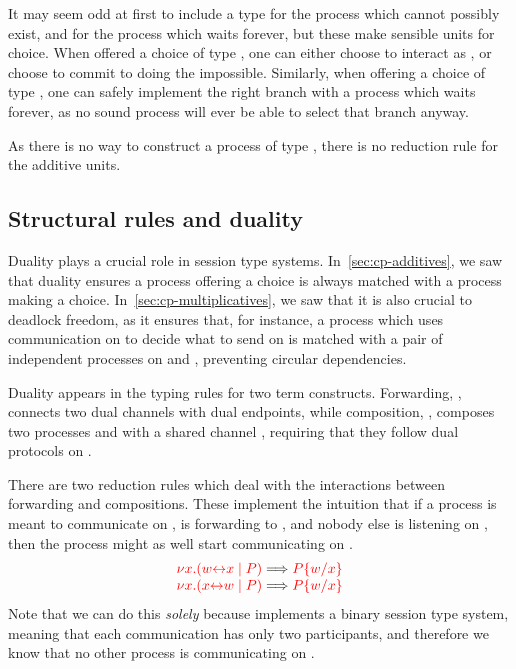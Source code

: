 It may seem odd at first to include a type for the process which cannot possibly
exist, and for the process which waits forever, but these make sensible units
for choice.
When offered a choice of type , one can either choose to
interact as , or choose to commit to doing the impossible.
Similarly, when offering a choice of type , one can safely
implement the right branch with a process which waits forever, as no sound
process will ever be able to select that branch anyway.
\begin{center}
  \cpInfNil
  \cpInfTop
\end{center}
As there is no way to construct a process of type \ty{\nil}, there is no
reduction rule for the additive units.


\subsection{Structural rules and duality}\label{sec:cp-duality}
Duality plays a crucial role in session type systems.
In~\cref{sec:cp-additives}, we saw that duality ensures a process offering a choice
is always matched with a process making a choice.
In~\cref{sec:cp-multiplicatives}, we saw that it is also crucial to deadlock freedom,
as it ensures that, for instance, a process which uses communication on 
to decide what to send on  is matched with a pair of independent processes
on  and , preventing circular dependencies.

Duality appears in the typing rules for two \rcp term constructs.
Forwarding, , connects two dual channels with dual endpoints,
while composition, , composes two processes  and
 with a shared channel , requiring that they follow dual protocols
on .
\begin{center}
  \cpInfAx
  \cpInfCut
\end{center}
There are two reduction rules which deal with the interactions between
forwarding and compositions. These implement the intuition that if a process is
meant to communicate on ,  is forwarding to , and nobody else
is listening on , then the process might as well start communicating on
.
\[
  \begin{array}{c}
    \tm{\cpCut{x}{\cpLink{w}{x}}{P}} \Longrightarrow \tm{\cpSub{w}{x}{P}} 
    \\
    \tm{\cpCut{x}{\cpLink{x}{w}}{P}} \Longrightarrow \tm{\cpSub{w}{x}{P}}  
  \end{array}
\]
Note that we can do this \emph{solely} because \rcp implements a binary session
type system, meaning that each communication has only two participants, and
therefore we know that no other process is communicating on .

